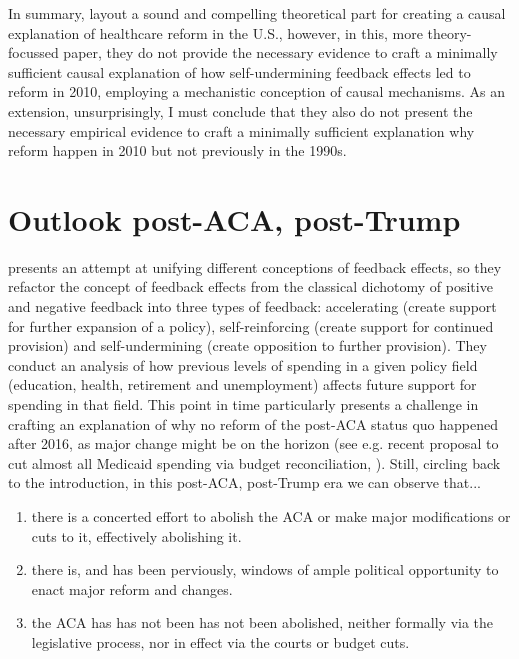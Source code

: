\documentclass[11pt]{article}
\begin{document}
In summary, \textcite[][]{Jacobs2014} layout a sound and compelling theoretical part for creating a causal explanation of healthcare reform in the U.S., however, in this, more theory-focussed paper, they do not provide the necessary evidence to craft a minimally sufficient causal explanation of how self-undermining feedback effects led to reform in 2010, employing a mechanistic conception of causal mechanisms. As an extension, unsurprisingly, I must conclude that they also do not present the necessary empirical evidence to craft a minimally sufficient explanation why reform happen in 2010 but not previously in the 1990s.

\section*{Outlook post-ACA, post-Trump}

\textcite[][]{Busemeyer2019} presents an attempt at unifying different conceptions of feedback effects, so they refactor the concept of feedback effects from the classical dichotomy of positive and negative feedback into three types of feedback: accelerating (create support for further expansion of a policy), self-reinforcing (create support for continued provision) and self-undermining (create opposition to further provision). They conduct an analysis of how previous levels of spending in a given policy field (education, health, retirement and unemployment) affects future support for spending in that field. This point in time particularly presents a challenge in crafting an explanation of why no reform of the post-ACA status quo happened after 2016, as major change might be on the horizon (see e.g. recent proposal to cut almost all Medicaid spending via budget reconciliation, ). Still, circling back to the introduction, in this post-ACA, post-Trump era we can observe that...

\begin{enumerate}[label={(\arabic*) ...}]
  \item there is a concerted effort to abolish the ACA or make major modifications or cuts to it, effectively abolishing it.
  \item there is, and has been perviously, windows of ample political opportunity to enact major reform and changes.
  \item the ACA has has not been has not been abolished, neither formally via the legislative process, nor in effect via the courts \parencite[][]{Liu2021} or budget cuts.
\end{enumerate}
\end{document}
